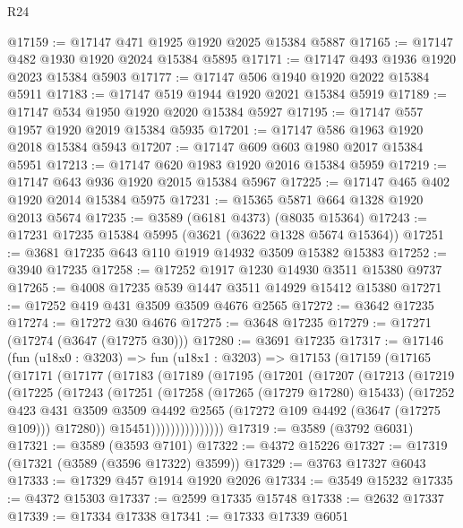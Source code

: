 \begin{lexlean}{R24}
\begin{coremodule}
@17159 := @17147 @471 @1925 @1920 @2025 @15384 @5887
@17165 := @17147 @482 @1930 @1920 @2024 @15384 @5895
@17171 := @17147 @493 @1936 @1920 @2023 @15384 @5903
@17177 := @17147 @506 @1940 @1920 @2022 @15384 @5911
@17183 := @17147 @519 @1944 @1920 @2021 @15384 @5919
@17189 := @17147 @534 @1950 @1920 @2020 @15384 @5927
@17195 := @17147 @557 @1957 @1920 @2019 @15384 @5935
@17201 := @17147 @586 @1963 @1920 @2018 @15384 @5943
@17207 := @17147 @609 @603 @1980 @2017 @15384 @5951
@17213 := @17147 @620 @1983 @1920 @2016 @15384 @5959
@17219 := @17147 @643 @936 @1920 @2015 @15384 @5967
@17225 := @17147 @465 @402 @1920 @2014 @15384 @5975
@17231 := @15365 @5871 @664 @1328 @1920 @2013 @5674
@17235 := @3589 (@6181 @4373) (@8035 @15364)
@17243 := @17231 @17235 @15384 @5995 (@3621 (@3622 @1328 @5674 @15364))
@17251 := @3681 @17235 @643 @110 @1919 @14932 @3509 @15382 @15383
@17252 := @3940 @17235
@17258 := @17252 @1917 @1230 @14930 @3511 @15380 @9737
@17265 := @4008 @17235 @539 @1447 @3511 @14929 @15412 @15380
@17271 := @17252 @419 @431 @3509 @3509 @4676 @2565
@17272 := @3642 @17235
@17274 := @17272 @30 @4676
@17275 := @3648 @17235
@17279 := @17271 (@17274 (@3647 (@17275 @30)))
@17280 := @3691 @17235
@17317 := @17146
    (fun (u18x0 : @3203) =>
    fun (u18x1 : @3203) =>
    @17153
      (@17159
        (@17165
          (@17171
            (@17177
              (@17183
                (@17189
                  (@17195
                    (@17201
                      (@17207
                        (@17213
                          (@17219
                            (@17225
                              (@17243
                                (@17251
                                  (@17258
                                    (@17265 (@17279 @17280) @15433)
                                    (@17252
                                      @423
                                      @431
                                      @3509
                                      @3509
                                      @4492
                                      @2565
                                      (@17272 @109 @4492 (@3647 (@17275 @109)))
                                      @17280))
                                  @15451)))))))))))))))
@17319 := @3589 (@3792 @6031)
@17321 := @3589 (@3593 @7101)
@17322 := @4372 @15226
@17327 := @17319 (@17321 (@3589 (@3596 @17322) @3599))
@17329 := @3763 @17327 @6043
@17333 := @17329 @457 @1914 @1920 @2026
@17334 := @3549 @15232
@17335 := @4372 @15303
@17337 := @2599 @17335 @15748
@17338 := @2632 @17337
@17339 := @17334 @17338
@17341 := @17333 @17339 @6051

\end{coremodule}
\end{lexlean}
